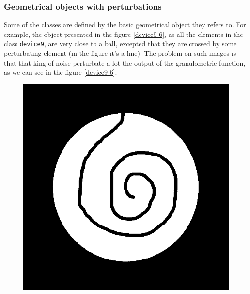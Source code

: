 \subsubsection{Geometrical objects with perturbations}

Some of the classes are defined by the basic geometrical object they refers to. For example, the object presented in the figure \ref{device9-6}, as all the elements in the class \texttt{device9}, are very close to a ball, excepted that they are crossed by some perturbating element (in the figure it's a line). The problem on such images is that that king of noise perturbate a lot the output of the granulometric function, as we can see in the figure \ref{device9-6}.

\begin{figure}[!ht]
	\begin{center}
    	\begin{minipage}[c]{.46\linewidth}
    		\includegraphics[scale=0.2]{images/device9-6-object.png}
    	\end{minipage} \hfill
    	\begin{minipage}[c]{.46\linewidth}

\end{minipage}
\end{center}
\end{figure}
